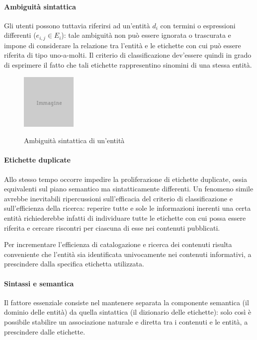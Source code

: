 
\paragraph{Ambiguità sintattica}
Gli utenti possono tuttavia riferirsi ad un'entità $d_i$ con termini o espressioni differenti ($e_{i,j} \in E_i$): tale ambiguità non può essere ignorata o trascurata e impone di considerare la relazione tra l'entità e le etichette con cui può essere riferita di tipo uno-a-molti. Il criterio di classificazione dev'essere quindi in grado di esprimere il fatto che tali etichette rappresentino sinomini di una stessa entità.

\begin{figure}[ht]
\begin{center}
\includegraphics{placeholder.png}
\label{fig:tesi:stage:fase-uno:ambiguita-sintattica-entita}
\caption{Ambiguità sintattica di un'entità}
\end{center}
\end{figure}

\paragraph{Etichette duplicate}
Allo stesso tempo occorre impedire la proliferazione di etichette duplicate, ossia equivalenti sul piano semantico ma sintatticamente differenti. Un fenomeno simile avrebbe inevitabili ripercussioni sull'efficacia del criterio di classificazione e sull'efficienza della ricerca: reperire tutte e sole le informazioni inerenti una certa entità richiederebbe infatti di individuare tutte le etichette con cui possa essere riferita e cercare riscontri per ciascuna di esse nei contenuti pubblicati.

Per incrementare l'efficienza di catalogazione e ricerca dei contenuti risulta conveniente che l'entità sia identificata univocamente nei contenuti informativi, a prescindere dalla specifica etichetta utilizzata.

\paragraph{Sintassi e semantica}
Il fattore essenziale consiste nel mantenere separata la componente semantica (il dominio delle entità) da quella sintattica (il dizionario delle etichette): solo così è possibile stabilire un associazione naturale e diretta tra i contenuti e le entità, a prescindere dalle etichette.

